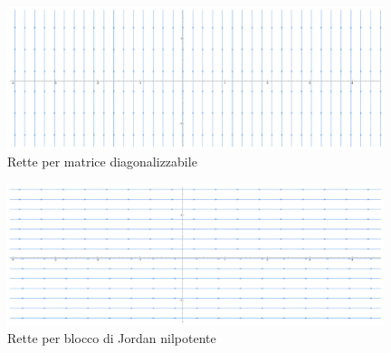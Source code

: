 \begin{figure}[!htb]
    \centering
    \includegraphics[width=11cm]{Immagini/rette_diagonale.pdf}
    \caption{Rette per matrice diagonalizzabile}
\end{figure}


\begin{figure}[!htb]
    \centering
    \includegraphics[width=11cm]{Immagini/rette_jordan.pdf}
    \caption{Rette per blocco di Jordan nilpotente}
\end{figure}




